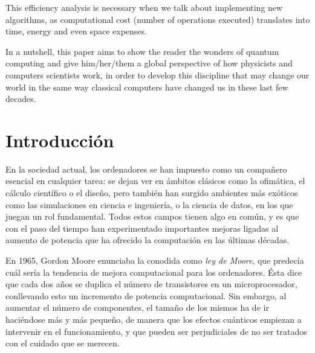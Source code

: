 \documentclass[11pt,a4paper,twoside,pdf]{article}
\numberwithin{equation}{section}
\begin{document}
\begin{center}
\begin{minipage}{0.8\linewidth}
		This efficiency analysis is necessary when we talk about implementing new algorithms, as computational cost (number of operations executed) translates into time, energy and even space expenses.
		
		In a nutshell, this paper aims to show the reader the wonders of quantum computing and give him/her/them a global perspective of how physicists and computers scientists work, in order to develop this discipline that may change our world in the same way classical computers have changed us in these last few decades.
	\end{minipage}
	
	\vfill
	
\end{center}


\newpage

\tableofcontents

\newpage{\ } 
\thispagestyle{empty} 

\newpage

\pagestyle{fancy}
\fancyhead[LO,RE]{\rightmark}
\fancyhead[RO,LE]{\thepage}
\fancyfoot{}

\section{Introducción}

En la sociedad actual, los ordenadores se han impuesto como un compañero esencial en cualquier tarea: se dejan ver en ámbitos clásicos como la ofimática, el cálculo científico o el diseño, pero también han surgido ambientes más exóticos como las simulaciones en ciencia e ingeniería, o la ciencia de datos, en los que juegan un rol fundamental. Todos estos campos tienen algo en común, y es que con el paso del tiempo han experimentado importantes mejoras ligadas al aumento de potencia que ha ofrecido la computación en las últimas décadas. 

En 1965, Gordon Moore enunciaba la conodida como \textit{ley de Moore}, que predecía cuál sería la tendencia de mejora computacional para los ordenadores. Ésta dice que cada dos años se duplica el número de transistores en un microprocesador, conllevando esto un incremento de potencia computacional. Sin embargo, al aumentar el número de componentes, el tamaño de los mismos ha de ir haciéndose más y más pequeño, de manera que los efectos cuánticos  empiezan a intervenir en el funcionamiento, y que pueden ser perjudiciales de no ser tratados con el cuidado que se merecen.
\end{document}
